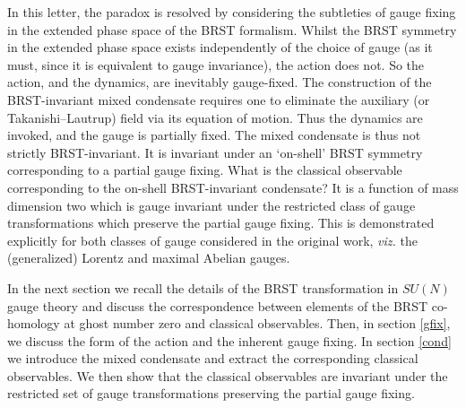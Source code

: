 \documentclass[a4paper,a4paper]{article}
\begin{document}
In this letter, the paradox is resolved by considering the subtleties of gauge fixing in the extended phase space of the BRST formalism. Whilst the BRST symmetry in the extended phase space exists independently of the choice of gauge (as it must, since it is equivalent to gauge invariance), the action does not. So the action, and the dynamics, are inevitably gauge-fixed. The construction of the BRST-invariant mixed condensate \cite{Kondo:2001nq} requires one to eliminate the auxiliary (or Takanishi--Lautrup) field via its equation of motion. Thus the dynamics are invoked, and the gauge is partially fixed. The mixed condensate is thus not strictly BRST-invariant. It is invariant under an `on-shell' BRST symmetry corresponding to a partial gauge fixing. What is the classical observable corresponding to the on-shell BRST-invariant condensate? It is a function of mass dimension two which is gauge invariant under the restricted class of gauge transformations which preserve the partial gauge fixing. This is demonstrated explicitly for both classes of gauge considered in the original work, \emph{viz.} the (generalized) Lorentz \cite{Curci:1976bt,Baulieu:1982sb,Baulieu:1985tg} and maximal Abelian \cite{'tHooft:1981ht,Kronfeld:1987vd,Kronfeld:1987ri,Kondo:1998pc,Kondo:1998nw} gauges.

In the next section we recall the details of the BRST transformation in $SU(N)$ gauge theory and discuss the correspondence between elements of the BRST co-homology at ghost number zero and classical observables. 
Then, in section \ref{gfix}, we discuss the form of the action and the inherent gauge fixing. In section \ref{cond} we introduce the mixed condensate and extract the corresponding classical observables. We then show that the classical observables are invariant under the restricted set of gauge transformations preserving the partial gauge fixing. 
%
%
%
%
%
\end{document}
